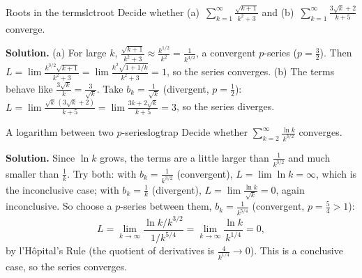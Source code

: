 \documentclass[11pt]{article}
\begin{document}
\begin{exmp}{Roots in the terms}{lctroot}
Decide whether (a)~$\displaystyle\sum_{k=1}^\infty\frac{\sqrt{k+1}}{k^2+3}$ and (b)~$\displaystyle\sum_{k=1}^\infty\frac{3\sqrt k+2}{k+5}$ converge.

\textbf{Solution.} (a) For large $k$, $\frac{\sqrt{k+1}}{k^2+3}\approx\frac{k^{1/2}}{k^2}=\frac1{k^{3/2}}$, a convergent $p$-series ($p=\frac32$). Then $L=\lim\frac{k^{3/2}\sqrt{k+1}}{k^2+3}=\lim\frac{k^2\sqrt{1+1/k}}{k^2+3}=1$, so the series converges.
(b) The terms behave like $\frac{3\sqrt k}k=\frac3{\sqrt k}$. Take $b_k=\frac1{\sqrt k}$ (divergent, $p=\frac12$): $L=\lim\frac{\sqrt k\,(3\sqrt k+2)}{k+5}=\lim\frac{3k+2\sqrt k}{k+5}=3$, so the series diverges.
\end{exmp}

\begin{exmp}{A logarithm between two $p$-series}{logtrap}
Decide whether $\displaystyle\sum_{k=2}^\infty\frac{\ln k}{k^{3/2}}$ converges.

\textbf{Solution.} Since $\ln k$ grows, the terms are a little larger than $\frac1{k^{3/2}}$ and much smaller than $\frac1k$. Try both: with $b_k=\frac1{k^{3/2}}$ (convergent), $L=\lim\ln k=\infty$, which is the inconclusive case; with $b_k=\frac1k$ (divergent), $L=\lim\frac{\ln k}{\sqrt k}=0$, again inconclusive. So choose a $p$-series between them, $b_k=\frac1{k^{5/4}}$ (convergent, $p=\frac54>1$):
\[
L=\lim_{k\to\infty}\frac{\ln k/k^{3/2}}{1/k^{5/4}}=\lim_{k\to\infty}\frac{\ln k}{k^{1/4}}=0 ,
\]
by l'H\^opital's Rule (the quotient of derivatives is $\frac4{k^{1/4}}\to0$). This is a conclusive case, so the series converges.
\end{exmp}
\end{document}

